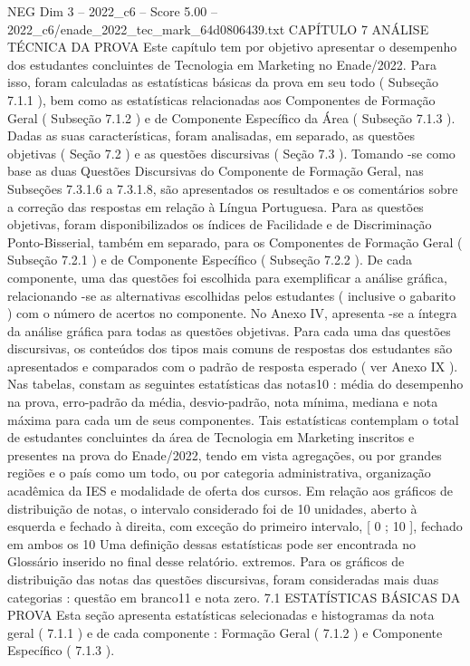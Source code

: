 \begin{textsample}{NEG Dim 3 – 2022\_c6 – Score 5.00 – 2022\_c6/enade\_2022\_tec\_mark\_64d0806439.txt}  \label{ex:f3_neg_264}
CAPÍTULO 7 ANÁLISE TÉCNICA DA PROVA Este capítulo tem por objetivo apresentar o desempenho dos estudantes concluintes de Tecnologia em Marketing no Enade/2022.
Para isso, foram calculadas as estatísticas básicas da prova em seu todo ( Subseção 7.1.1 ), bem como as estatísticas relacionadas aos Componentes de Formação Geral ( Subseção 7.1.2 ) e de Componente Específico da Área ( Subseção 7.1.3 ).
Dadas as suas características, foram analisadas, em separado, as questões objetivas ( Seção 7.2 ) e as questões discursivas ( Seção 7.3 ).
Tomando -se como base as duas Questões Discursivas do Componente de Formação Geral, nas Subseções 7.3.1.6 a 7.3.1.8, são apresentados os resultados e os comentários sobre a correção das respostas em relação à Língua Portuguesa.
Para as questões objetivas, foram disponibilizados os índices de Facilidade e de Discriminação Ponto-Bisserial, também em separado, para os Componentes de Formação Geral ( Subseção 7.2.1 ) e de Componente Específico ( Subseção 7.2.2 ).
De cada componente, uma das questões foi escolhida para exemplificar a análise gráfica, relacionando -se as alternativas escolhidas pelos estudantes ( inclusive o gabarito ) com o número de acertos no componente.
No Anexo IV, apresenta -se a íntegra da análise gráfica para todas as questões objetivas.
Para cada uma das questões discursivas, os conteúdos dos tipos mais comuns de respostas dos estudantes são apresentados e comparados com o padrão de resposta esperado ( ver Anexo IX ).
Nas tabelas, constam as seguintes estatísticas das notas10 : média do desempenho na prova, erro-padrão da média, desvio-padrão, nota mínima, mediana e nota máxima para cada um de seus componentes.
Tais estatísticas contemplam o total de estudantes concluintes da área de Tecnologia em Marketing inscritos e presentes na prova do Enade/2022, tendo em vista agregações, ou por grandes regiões e o país como um todo, ou por categoria administrativa, organização acadêmica da IES e modalidade de oferta dos cursos.
Em relação aos gráficos de distribuição de notas, o intervalo considerado foi de 10 unidades, aberto à esquerda e fechado à direita, com exceção do primeiro intervalo, [ 0 ; 10 ], fechado em ambos os 10 Uma definição dessas estatísticas pode ser encontrada no Glossário inserido no final desse relatório. extremos.
Para os gráficos de distribuição das notas das questões discursivas, foram consideradas mais duas categorias : questão em branco11 e nota zero. 7.1 ESTATÍSTICAS BÁSICAS DA PROVA Esta seção apresenta estatísticas selecionadas e histogramas da nota geral ( 7.1.1 ) e de cada componente : Formação Geral ( 7.1.2 ) e Componente Específico ( 7.1.3 ).

\end{textsample}
